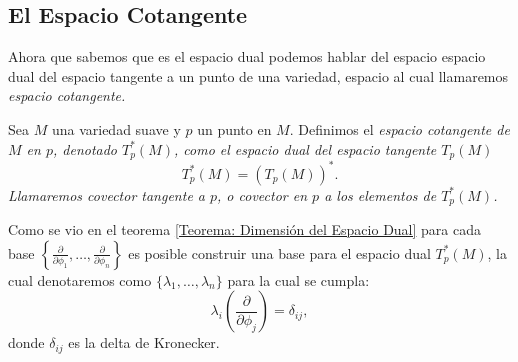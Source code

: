 \subsection{El Espacio Cotangente}\label{Subsección: El Espacio Cotangente}
Ahora que sabemos que es el espacio dual podemos hablar del espacio espacio dual del espacio tangente a un punto de una variedad, espacio al cual llamaremos \it{espacio cotangente}.

\begin{definition}
  Sea $M$ una variedad suave y $p$ un punto en $M$. Definimos el \it{espacio cotangente de $M$ en $p$}, denotado $T_{p}^{*}(M)$, como el espacio dual del espacio tangente $T_p(M)$
\[
  T^{*}_p(M) = (T_p(M))^*.
\]
  Llamaremos \textit{covector tangente a $p$}, o \textit{covector en $p$} a los elementos de $T_p^{*}(M)$.
\end{definition}

Como se vio en el teorema \ref{Teorema: Dimensión del Espacio Dual} para cada base $\left\{\frac{\partial}{\partial \phi_1}, \ldots, \frac{\partial}{\partial \phi_n}\right\}$ es posible construir una base para el espacio dual $T_p^*(M)$, la cual denotaremos como $\{\lambda_1, \ldots, \lambda_n\}$ para la cual se cumpla:
\[
  \lambda_i \left(\frac{\partial}{\partial \phi_j}\right) = \delta_{ij},
\]
donde $\delta_{ij}$ es la delta de Kronecker. 

